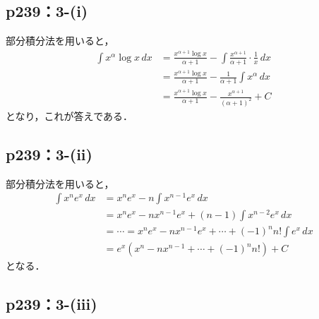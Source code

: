\documentclass[a4paper,10pt,fleqn]{ltjsarticle}
\begin{document}
\subsection*{p239：3-(i)}

\begin{tleftbar}
    部分積分法を用いると，
    \begin{align*}
        \int x^\alpha \log x \, dx & = \frac{x^{\alpha +1} \log x}{\alpha +1}　- \int \frac{x^{\alpha +1}}{\alpha+1} \cdot \frac{1}{x} \, dx \\
                                   & = \frac{x^{\alpha +1} \log x}{\alpha +1}- \frac{1}{\alpha +1} \int x^{\alpha} \, dx                    \\
                                   & = \frac{x^{\alpha+1} \log x}{\alpha +1} - \frac{x^{\alpha +1}}{(\alpha +1)^2}+ C
    \end{align*}
    となり，これが答えである．
\end{tleftbar}

\subsection*{p239：3-(ii)}

\begin{tleftbar}
    部分積分法を用いると，
    \begin{align*}
        \int x^n e^x \, dx & = x^n e^x - n \int x^{n-1} e^x \, dx                                   \\
                           & = x^n e^x - n x^{n-1} e^x + (n-1)\int x^{n-2} e^x \, dx                \\
                           & = \cdots = x^n e^x - n x^{n-1} e^x + \cdots + (-1)^n n! \int e^x \, dx \\
                           & = e^x (x^n -n x^{n-1}+ \cdots +(-1)^n n!) + C
    \end{align*}
    となる．
\end{tleftbar}

\subsection*{p239：3-(iii)}
\end{document}
